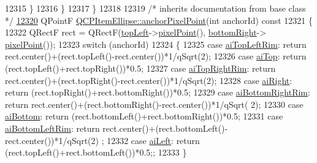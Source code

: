 \begin{DoxyCode}
12315     \}
12316   \}
12317 \}
12318 
12319 \textcolor{comment}{/* inherits documentation from base class */}
\hypertarget{a00115_source_l12320}{}\hyperlink{a00035_ad3c607304dba081e2f778b6a81b903bb}{12320} QPointF \hyperlink{a00035_ad3c607304dba081e2f778b6a81b903bb}{QCPItemEllipse::anchorPixelPoint}(\textcolor{keywordtype}{int} anchorId)\textcolor{keyword}{ const}
12321 \textcolor{keyword}{}\{
12322   QRectF rect = QRectF(\hyperlink{a00035_a12fd8420c06718d0c8a2303d6a652848}{topLeft}->\hyperlink{a00038_ae490f9c76ee2ba33752c495d3b6e8fb5}{pixelPoint}(), \hyperlink{a00035_ab73c8deafc0d8d1ef7d75b6cdcc37159}{bottomRight}->
      \hyperlink{a00038_ae490f9c76ee2ba33752c495d3b6e8fb5}{pixelPoint}());
12323   \textcolor{keywordflow}{switch} (anchorId)
12324   \{
12325     \textcolor{keywordflow}{case} \hyperlink{a00035_a415009889543169f35b70795f415e45eab2538849b88921e7fc1dcc15b2a6109d}{aiTopLeftRim}:     \textcolor{keywordflow}{return} rect.center()+(rect.topLeft()-rect.center())*1/qSqrt(2);
12326     \textcolor{keywordflow}{case} \hyperlink{a00035_a415009889543169f35b70795f415e45ea83e55b0c1799baac1eecab52bcbe096d}{aiTop}:            \textcolor{keywordflow}{return} (rect.topLeft()+rect.topRight())*0.5;
12327     \textcolor{keywordflow}{case} \hyperlink{a00035_a415009889543169f35b70795f415e45ea415d82233c14f0c70c245d50e706e75b}{aiTopRightRim}:    \textcolor{keywordflow}{return} rect.center()+(rect.topRight()-rect.center())*1/qSqrt(2);
12328     \textcolor{keywordflow}{case} \hyperlink{a00035_a415009889543169f35b70795f415e45ea0f0dcfdf87d9405b53b2129740fb6ba6}{aiRight}:          \textcolor{keywordflow}{return} (rect.topRight()+rect.bottomRight())*0.5;
12329     \textcolor{keywordflow}{case} \hyperlink{a00035_a415009889543169f35b70795f415e45eab62732e96d67801d50c6a9bdebc374d0}{aiBottomRightRim}: \textcolor{keywordflow}{return} rect.center()+(rect.bottomRight()-rect.center())*1/qSqrt(
      2);
12330     \textcolor{keywordflow}{case} \hyperlink{a00035_a415009889543169f35b70795f415e45ea5894287dedaeec1f48394fd950ccff5b}{aiBottom}:         \textcolor{keywordflow}{return} (rect.bottomLeft()+rect.bottomRight())*0.5;
12331     \textcolor{keywordflow}{case} \hyperlink{a00035_a415009889543169f35b70795f415e45ea7b8101bfc590af8ce32961f6545c4f90}{aiBottomLeftRim}:  \textcolor{keywordflow}{return} rect.center()+(rect.bottomLeft()-rect.center())*1/qSqrt(2)
      ;
12332     \textcolor{keywordflow}{case} \hyperlink{a00035_a415009889543169f35b70795f415e45eae74dad00419a0e1f42877510158fb922}{aiLeft}:           \textcolor{keywordflow}{return} (rect.topLeft()+rect.bottomLeft())*0.5;;
12333   \}

\end{DoxyCode}
